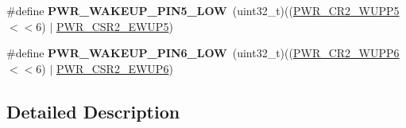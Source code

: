 \begin{DoxyCompactItemize}
\item 
\mbox{\label{group___p_w_r_ex___wake_up___pins_ga602a80b3379fe10be146b365bd85fe01}} 
\#define {\bfseries P\+W\+R\+\_\+\+W\+A\+K\+E\+U\+P\+\_\+\+P\+I\+N5\+\_\+\+L\+OW}~(uint32\+\_\+t)((\mbox{\hyperlink{group___peripheral___registers___bits___definition_ga3df74a55d4a862ebc9ba47ec68a5a818}{P\+W\+R\+\_\+\+C\+R2\+\_\+\+W\+U\+P\+P5}}$<$$<$6) $\vert$ \mbox{\hyperlink{group___peripheral___registers___bits___definition_ga69f8a9594c8cfd34d5c8329d64e55273}{P\+W\+R\+\_\+\+C\+S\+R2\+\_\+\+E\+W\+U\+P5}})
\item 
\mbox{\label{group___p_w_r_ex___wake_up___pins_ga46e1b210a3805f27c4ae46a4cdc22f82}} 
\#define {\bfseries P\+W\+R\+\_\+\+W\+A\+K\+E\+U\+P\+\_\+\+P\+I\+N6\+\_\+\+L\+OW}~(uint32\+\_\+t)((\mbox{\hyperlink{group___peripheral___registers___bits___definition_ga1c69a2e96770713aebeee5ec3996386b}{P\+W\+R\+\_\+\+C\+R2\+\_\+\+W\+U\+P\+P6}}$<$$<$6) $\vert$ \mbox{\hyperlink{group___peripheral___registers___bits___definition_gadb014af72197cbc8e28fb4b46819827b}{P\+W\+R\+\_\+\+C\+S\+R2\+\_\+\+E\+W\+U\+P6}})
\end{DoxyCompactItemize}


\subsection{Detailed Description}
